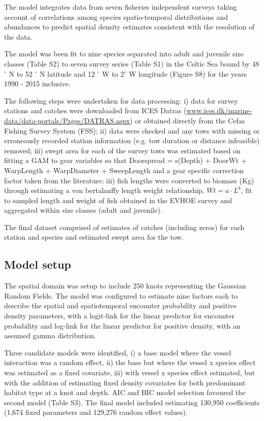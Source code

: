 \documentclass{nature}
\begin{document}
The model integrates data from seven fisheries independent surveys taking
account of correlations among species spatio-temporal distributions and
abundances to predict spatial density estimates consistent with the resolution
of the data. 

The model was been fit to nine species separated into adult and juvenile size
classes (Table S2) to seven survey series (Table S1) in the Celtic Sea bound by
48$^{\circ}$ N to 52 $^{\circ}$ N latitude and 12 $^{\circ}$ W to 2$^{\circ}$ W
longitude (Figure S8) for the years 1990 - 2015 inclusive. 

The following steps were undertaken for data processing: i) data for survey
stations and catches were downloaded from ICES Datras
(\url{www.ices.dk/marine-data/data-portals/Pages/DATRAS.aspx}) or obtained
directly from the Cefas Fishing Survey System (FSS); ii) data were checked and
any tows with missing or erroneously recorded station information (e.g. tow
duration or distance infeasible) removed; iii) swept area for each of the
survey tows was estimated based on fitting a GAM to gear variables so that
Doorspread = s(Depth) + DoorWt + WarpLength + WarpDiameter + SweepLength and a
gear specific correction factor taken from the literature\cite{Piet2009}; iii)
fish lengths were converted to biomass (Kg) through estimating a von
bertalanffy length weight relationship, $Wt = a \cdot L^{b}$, fit to sampled
length and weight of fish obtained in the EVHOE survey and aggregated within
size classes (adult and juvenile). 

The final dataset comprised of estimates of catches (including zeros) for each
station and species and estimated swept area for the tow.

\subsection{Model setup}

The spatial domain was setup to include 250 knots representing the Gaussian
Random Fields. The model was configured to estimate nine factors each to describe
the spatial and spatiotemporal encounter probability and positive density
parameters, with a logit-link for the linear predictor for encounter
probability and log-link for the linear predictor for positive density, with an
assumed gamma distribution.

Three candidate models were identified, i) a base model where the vessel
interaction was a random effect, ii) the base but where the vessel x species
effect was estimated as a fixed covariate, iii) with vessel x species effect
estimated, but with the addition of estimating fixed density covariates for
both predominant habitat type at a knot and depth. AIC and BIC model selection
favoured the second model (Table S3). The final model included estimating
130,950 coefficients (1,674 fixed parameters and 129,276 random effect values).
\end{document}
